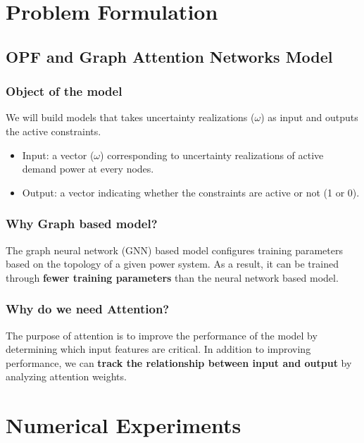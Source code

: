 \documentclass [11pt]{article}
\begin{document}
\section{Problem Formulation}

\subsection{OPF and Graph Attention Networks Model}

\subsubsection{Object of the model}

We will build models that takes uncertainty realizations ($\omega$) as input and outputs the active constraints.

\begin{itemize}
  \item Input: a vector ($\omega$) corresponding to uncertainty realizations of active demand power at every nodes.
  \item Output: a vector indicating whether the constraints are active or not (1 or 0).
\end{itemize}

\subsubsection{Why Graph based model?}

The graph neural network (GNN) \cite{GNN} based model configures training parameters based on the topology of a given power system. As a result, it can be trained through \textbf{fewer training parameters} than the neural network based model.

\subsubsection{Why do we need Attention?}

The purpose of attention is to improve the performance of the model by determining which input features are critical. In addition to improving performance, we can \textbf{track the relationship between input and output} by analyzing attention weights.


\section{Numerical Experiments}
\end{document}
